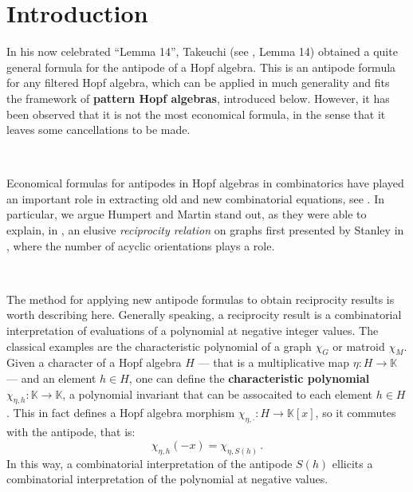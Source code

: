 \documentclass[12pt, reqno]{amsart}
\theoremstyle{definition}
\begin{document}
\section{Introduction\label{sec:intro}}

In his now celebrated  ``Lemma 14'', Takeuchi (see \cite{Takeuchi1971}, Lemma 14) obtained a quite general formula for the antipode of a Hopf algebra. 
This is an antipode formula for any filtered Hopf algebra, which can be applied in much generality and fits the framework of \textbf{pattern Hopf algebras}, introduced below.
However, it has been observed that it is not the most economical formula, in the sense that it leaves some cancellations to be made.

\

Economical formulas for antipodes in Hopf algebras in combinatorics have played an important role in extracting old and new combinatorial equations, see \cite{Schmitt1993, humpert2012incidence, BS2017, aguiar2017hopf, xu2022cancellation}.
In particular, we argue Humpert and Martin stand out, as they were able to explain, in \cite{humpert2012incidence}, an elusive \textit{reciprocity relation} on graphs first presented by Stanley in \cite{stanley1975combinatorial}, where the number of acyclic orientations plays a role.

\

The method for applying new antipode formulas to obtain reciprocity results is worth describing here.
Generally speaking, a reciprocity result is a combinatorial interpretation of evaluations of a polynomial at negative integer values.
The classical examples are the characteristic polynomial of a graph $\chi_G$ or matroid $\chi_M$.
Given a character of a Hopf algebra $H$ --- that is a multiplicative map $\eta: H \to \mathbb{K}$ --- and an element $h\in H$, one can define the \textbf{characteristic polynomial} $\chi_{\eta, h}: \mathbb{K} \to \mathbb{K}$, a polynomial invariant that can be assocaited to each element $h\in H$.
This in fact defines a Hopf algebra morphism $\chi_{\eta, \cdot } : H \to \mathbb{K}[x]$, so it commutes with the antipode, that is:
$$\chi_{\eta, h } (-x) = \chi_{\eta, S(h) } \, . $$
In this way, a combinatorial interpretation of the antipode $S(h)$ ellicits a combinatorial interpretation of the polynomial at negative values.

\

\end{document}
